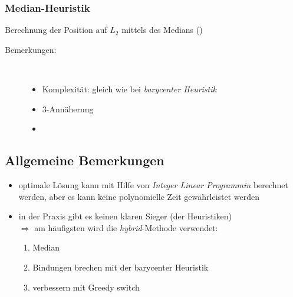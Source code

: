 \subsubsection{Median-Heuristik}
Berechnung der Position auf $L_2$ mittels des Medians ()
\begin{description}
	\item[Bemerkungen:]\ \\ \vspace*{-\baselineskip}
		\begin{itemize}
			\item Komplexität: gleich wie bei \textit{barycenter Heuristik}
			\item 3-Annäherung
			\item {}
		\end{itemize}
\end{description}
\subsection{Allgemeine Bemerkungen}
\begin{itemize}[itemsep=-1pt]
	\item optimale Lösung kann mit Hilfe von \textit{Integer Linear Programmin} berechnet werden, aber es kann keine polynomielle Zeit gewährleistet werden
	\item in der Praxis gibt es keinen klaren Sieger (der Heuristiken)\\
		$\Rightarrow$ am häufigsten wird die \textit{hybrid}-Methode verwendet:
			\begin{enumerate}
				\item Median
				\item Bindungen brechen mit der barycenter Heuristik
				\item verbessern mit Greedy switch
			\end{enumerate}
\end{itemize}